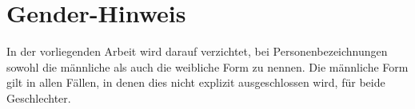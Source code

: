 \clearpage

\chapter*{Gender-Hinweis}

In der vorliegenden Arbeit wird darauf verzichtet, bei Personenbezeichnungen sowohl die männliche als auch die weibliche Form zu nennen. Die männliche Form gilt in allen Fällen, in denen dies nicht explizit ausgeschlossen wird, für beide Geschlechter.